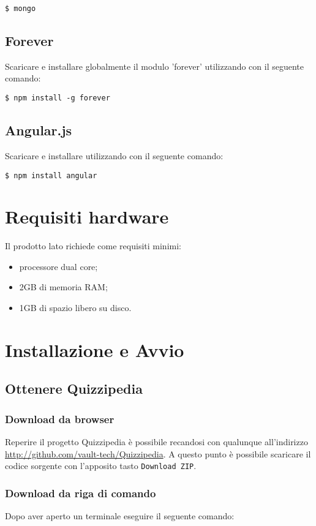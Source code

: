 \documentclass[a4paper, titlepage]{article}
\begin{document}
	\texttt{\$ mongo}

	\subsection{Forever}
	Scaricare e installare globalmente il modulo 'forever' utilizzando  con il seguente comando:

	\texttt{\$ npm install -g forever}
	
	\subsection{Angular.js}
	Scaricare e installare  utilizzando  con il seguente comando:

	\texttt{\$ npm install angular}
	
	\section{Requisiti hardware}
	Il prodotto lato  richiede come requisiti minimi:
	\begin{itemize}
		\item processore dual core;
		\item 2GB di memoria RAM;
		\item 1GB di spazio libero su disco.
	\end{itemize}
	
	\section{Installazione e Avvio}
	
	\subsection{Ottenere Quizzipedia}
	\subsubsection{Download da browser}
	Reperire il progetto Quizzipedia è possibile recandosi con qualunque  all'indirizzo \url{http://github.com/vault-tech/Quizzipedia}.
	A questo punto è possibile scaricare il codice sorgente con l'apposito tasto \texttt{Download ZIP}.

	\subsubsection{Download da riga di comando}
	Dopo aver aperto un terminale eseguire il seguente comando:
\end{document}
